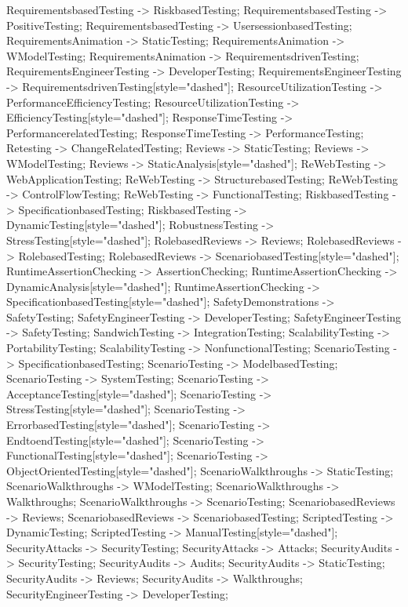\documentclass{article}
\begin{document}
{RequirementsbasedTesting -> RiskbasedTesting;
RequirementsbasedTesting -> PositiveTesting;
RequirementsbasedTesting -> UsersessionbasedTesting;
RequirementsAnimation -> StaticTesting;
RequirementsAnimation -> WModelTesting;
RequirementsAnimation -> RequirementsdrivenTesting;
RequirementsEngineerTesting -> DeveloperTesting;
RequirementsEngineerTesting -> RequirementsdrivenTesting[style="dashed"];
ResourceUtilizationTesting -> PerformanceEfficiencyTesting;
ResourceUtilizationTesting -> EfficiencyTesting[style="dashed"];
ResponseTimeTesting -> PerformancerelatedTesting;
ResponseTimeTesting -> PerformanceTesting;
Retesting -> ChangeRelatedTesting;
Reviews -> StaticTesting;
Reviews -> WModelTesting;
Reviews -> StaticAnalysis[style="dashed"];
ReWebTesting -> WebApplicationTesting;
ReWebTesting -> StructurebasedTesting;
ReWebTesting -> ControlFlowTesting;
ReWebTesting -> FunctionalTesting;
RiskbasedTesting -> SpecificationbasedTesting;
RiskbasedTesting -> DynamicTesting[style="dashed"];
RobustnessTesting -> StressTesting[style="dashed"];
RolebasedReviews -> Reviews;
RolebasedReviews -> RolebasedTesting;
RolebasedReviews -> ScenariobasedTesting[style="dashed"];
RuntimeAssertionChecking -> AssertionChecking;
RuntimeAssertionChecking -> DynamicAnalysis[style="dashed"];
RuntimeAssertionChecking -> SpecificationbasedTesting[style="dashed"];
SafetyDemonstrations -> SafetyTesting;
SafetyEngineerTesting -> DeveloperTesting;
SafetyEngineerTesting -> SafetyTesting;
SandwichTesting -> IntegrationTesting;
ScalabilityTesting -> PortabilityTesting;
ScalabilityTesting -> NonfunctionalTesting;
ScenarioTesting -> SpecificationbasedTesting;
ScenarioTesting -> ModelbasedTesting;
ScenarioTesting -> SystemTesting;
ScenarioTesting -> AcceptanceTesting[style="dashed"];
ScenarioTesting -> StressTesting[style="dashed"];
ScenarioTesting -> ErrorbasedTesting[style="dashed"];
ScenarioTesting -> EndtoendTesting[style="dashed"];
ScenarioTesting -> FunctionalTesting[style="dashed"];
ScenarioTesting -> ObjectOrientedTesting[style="dashed"];
ScenarioWalkthroughs -> StaticTesting;
ScenarioWalkthroughs -> WModelTesting;
ScenarioWalkthroughs -> Walkthroughs;
ScenarioWalkthroughs -> ScenarioTesting;
ScenariobasedReviews -> Reviews;
ScenariobasedReviews -> ScenariobasedTesting;
ScriptedTesting -> DynamicTesting;
ScriptedTesting -> ManualTesting[style="dashed"];
SecurityAttacks -> SecurityTesting;
SecurityAttacks -> Attacks;
SecurityAudits -> SecurityTesting;
SecurityAudits -> Audits;
SecurityAudits -> StaticTesting;
SecurityAudits -> Reviews;
SecurityAudits -> Walkthroughs;
SecurityEngineerTesting -> DeveloperTesting;
}
\end{document}
